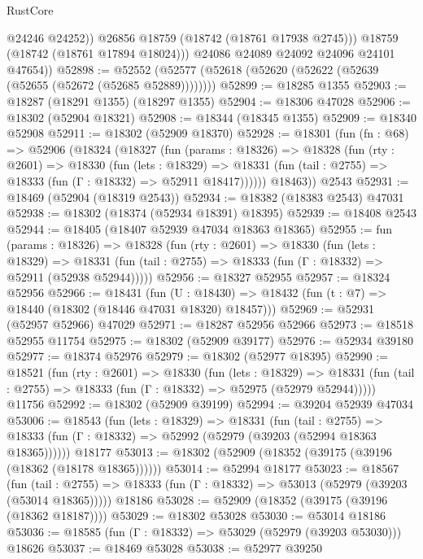 \begin{lexlean}{RustCore}
\begin{coremodule}
                @24246
                @24252))
            @26856
            @18759
            (@18742 (@18761 @17938 @2745)))
          @18759
          (@18742 (@18761 @17894 @18024)))
        @24086
        @24089
        @24092
        @24096
        @24101
        @47654))
@52898 := @52552 (@52577 (@52618 (@52620 (@52622 (@52639 (@52655 (@52672 (@52685 @52889))))))))
@52899 := @18285 @1355
@52903 := @18287 (@18291 @1355) (@18297 @1355)
@52904 := @18306 @47028
@52906 := @18302 (@52904 @18321)
@52908 := @18344 (@18345 @1355)
@52909 := @18340 @52908
@52911 := @18302 (@52909 @18370)
@52928 := @18301
    (fun (fn : @68) =>
    @52906
      (@18324
        (@18327
          (fun (params : @18326) =>
          @18328
            (fun (rty : @2601) =>
            @18330
              (fun (lets : @18329) =>
              @18331 (fun (tail : @2755) => @18333 (fun (Γ : @18332) => @52911 @18417))))))
        @18463))
    @2543
@52931 := @18469 (@52904 (@18319 @2543))
@52934 := @18382 (@18383 @2543) @47031
@52938 := @18302 (@18374 (@52934 @18391) @18395)
@52939 := @18408 @2543
@52944 := @18405 (@18407 @52939 @47034 @18363 @18365)
@52955 := fun (params : @18326) =>
  @18328
    (fun (rty : @2601) =>
    @18330
      (fun (lets : @18329) =>
      @18331 (fun (tail : @2755) => @18333 (fun (Γ : @18332) => @52911 (@52938 @52944)))))
@52956 := @18327 @52955
@52957 := @18324 @52956
@52966 := @18431
    (fun (U : @18430) => @18432 (fun (t : @7) => @18440 (@18302 (@18446 @47031 @18320) @18457)))
@52969 := @52931 (@52957 @52966) @47029
@52971 := @18287 @52956 @52966
@52973 := @18518 @52955 @11754
@52975 := @18302 (@52909 @39177)
@52976 := @52934 @39180
@52977 := @18374 @52976
@52979 := @18302 (@52977 @18395)
@52990 := @18521
    (fun (rty : @2601) =>
    @18330
      (fun (lets : @18329) =>
      @18331 (fun (tail : @2755) => @18333 (fun (Γ : @18332) => @52975 (@52979 @52944)))))
    @11756
@52992 := @18302 (@52909 @39199)
@52994 := @39204 @52939 @47034
@53006 := @18543
    (fun (lets : @18329) =>
    @18331
      (fun (tail : @2755) =>
      @18333 (fun (Γ : @18332) => @52992 (@52979 (@39203 (@52994 @18363 @18365))))))
    @18177
@53013 := @18302 (@52909 (@18352 (@39175 (@39196 (@18362 (@18178 @18365))))))
@53014 := @52994 @18177
@53023 := @18567
    (fun (tail : @2755) => @18333 (fun (Γ : @18332) => @53013 (@52979 (@39203 (@53014 @18365)))))
    @18186
@53028 := @52909 (@18352 (@39175 (@39196 (@18362 @18187))))
@53029 := @18302 @53028
@53030 := @53014 @18186
@53036 := @18585 (fun (Γ : @18332) => @53029 (@52979 (@39203 @53030))) @18626
@53037 := @18469 @53028
@53038 := @52977 @39250

\end{coremodule}
\end{lexlean}
